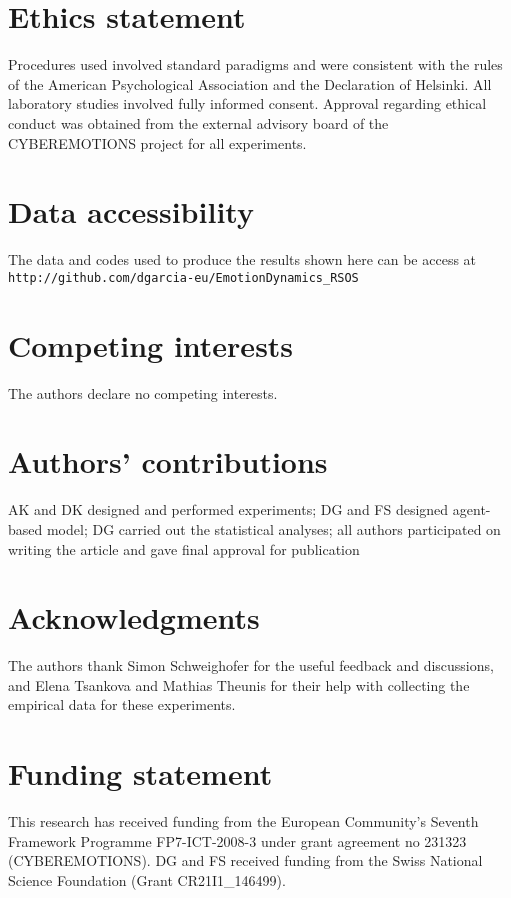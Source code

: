 \documentclass[nologo,url,11pt,a4paper]{ETHpaper}
\begin{document}
  

\section*{Ethics statement}
Procedures used involved standard paradigms and were consistent with the rules of the American Psychological Association and the Declaration of Helsinki. All laboratory studies involved fully informed consent. Approval regarding ethical conduct was obtained from the external advisory board of the CYBEREMOTIONS project for all experiments.

\section*{Data accessibility}
The data and codes used to produce the results shown here can be access at\\
\texttt{http://github.com/dgarcia-eu/EmotionDynamics\_RSOS}

\section*{Competing interests}
The authors declare no competing interests.

\section*{Authors' contributions}
AK and DK designed and performed experiments; DG and FS designed agent-based model; DG 
carried out the statistical analyses; all authors participated on writing the article and gave final approval for publication

\section*{Acknowledgments}
The authors thank Simon Schweighofer for the useful feedback and discussions, and Elena Tsankova and Mathias Theunis for their help with collecting the empirical data for these experiments.

\section*{Funding statement}
This research has received funding from the European Community's Seventh Framework Programme FP7-ICT-2008-3 under grant agreement no 231323 (CYBEREMOTIONS). DG and FS received funding from the Swiss National Science Foundation (Grant CR21I1\_146499). 
\end{document}
